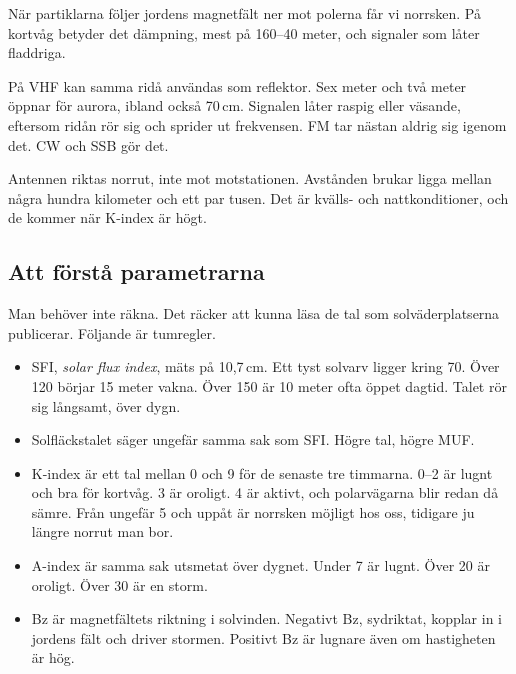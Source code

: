När partiklarna följer jordens magnetfält ner mot polerna får vi norrsken.
På kortvåg betyder det dämpning, mest på 160--40 meter, och signaler som
låter fladdriga.

På VHF kan samma ridå användas som reflektor. Sex meter och två meter öppnar
för aurora, ibland också 70\,cm. Signalen låter raspig eller väsande,
eftersom ridån rör sig och sprider ut frekvensen. FM tar nästan aldrig sig
igenom det. CW och SSB gör det.

Antennen riktas norrut, inte mot motstationen. Avstånden brukar ligga mellan
några hundra kilometer och ett par tusen. Det är kvälls- och nattkonditioner,
och de kommer när K-index är högt.

\subsection{Att förstå parametrarna}

Man behöver inte räkna. Det räcker att kunna läsa de tal som
solväderplatserna publicerar. Följande är tumregler.

\begin{itemize}
	\item SFI, {\it solar flux index}, mäts på 10,7\,cm. Ett tyst solvarv
		ligger kring 70. Över 120 börjar 15 meter vakna. Över 150 är
		10 meter ofta öppet dagtid. Talet rör sig långsamt, över dygn.
	\item Solfläckstalet säger ungefär samma sak som SFI. Högre tal,
		högre MUF.
	\item K-index är ett tal mellan 0 och 9 för de senaste tre timmarna.
		0--2 är lugnt och bra för kortvåg. 3 är oroligt. 4 är aktivt,
		och polarvägarna blir redan då sämre. Från ungefär 5 och uppåt
		är norrsken möjligt hos oss, tidigare ju längre norrut man bor.
	\item A-index är samma sak utsmetat över dygnet. Under 7 är lugnt.
		Över 20 är oroligt. Över 30 är en storm.
	\item Bz är magnetfältets riktning i solvinden. Negativt Bz, sydriktat,
		kopplar in i jordens fält och driver stormen. Positivt Bz är
		lugnare även om hastigheten är hög.
\end{itemize}

